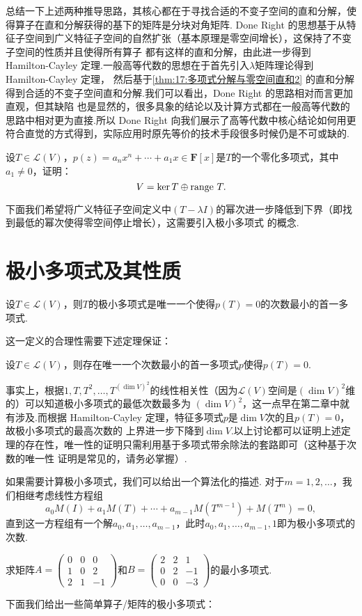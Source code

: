 总结一下上述两种推导思路，其核心都在于寻找合适的不变子空间的直和分解，使得算子在直和分解获得的基下的矩阵是分块对角矩阵.
 Done Right 的思想基于从特征子空间到广义特征子空间的自然扩张（基本原理是零空间增长），这保持了不变子空间的性质并且使得所有算子
都有这样的直和分解，由此进一步得到 Hamilton-Cayley 定理.一般高等代数的思想在于首先引入$\lambda$矩阵理论得到 Hamilton-Cayley 定理，
然后基于\autoref{thm:17:多项式分解与零空间直和2} 的直和分解得到合适的不变子空间直和分解.我们可以看出，Done Right 的思路相对而言更加直观，但其缺陷
也是显然的，很多具象的结论以及计算方式都在一般高等代数的思路中相对更为直接.所以 Done Right 向我们展示了高等代数中核心结论如何用更
符合直觉的方式得到，实际应用时原先等价的技术手段很多时候仍是不可或缺的.
\begin{example}
    设$T\in \mathcal{L}(V)$，$p(z)=a_nx^n+\cdots+a_1x\in\mathbf{F}[x]$是$T$的一个零化多项式，其中$a_1\neq 0$，证明：
    \[V=\ker T\oplus\textup{range }T.\]
\end{example}
下面我们希望将广义特征子空间定义中$(T-\lambda I)$的幂次进一步降低到下界（即找到最低的幂次使得零空间停止增长），这需要引入极小多项式
的概念.

\section{极小多项式及其性质}
\begin{definition}
    设$T\in \mathcal{L}(V)$，则$T$的极小多项式是唯一一个使得$p(T)=0$的次数最小的首一多项式.
\end{definition}
这一定义的合理性需要下述定理保证：
\begin{theorem}
    设$T\in \mathcal{L}(V)$，则存在唯一一个次数最小的首一多项式$p$使得$p(T)=0$.
\end{theorem}
事实上，根据$1,T,T^2,\ldots,T^{(\dim V)^2}$的线性相关性（因为$\mathcal{L}(V)$空间是$(\dim V)^2$维的）可以知道极小多项式的最低次数最多为
$(\dim V)^2$，这一点早在第二章中就有涉及.而根据 Hamilton-Cayley 定理，特征多项式$p$是$\dim V$次的且$p(T)=0$，故极小多项式的最高次数的
上界进一步下降到$\dim V$.以上讨论都可以证明上述定理的存在性，唯一性的证明只需利用基于多项式带余除法的套路即可（这种基于次数的唯一性
证明是常见的，请务必掌握）.

如果需要计算极小多项式，我们可以给出一个算法化的描述. 对于$m=1,2,\ldots$，我们相继考虑线性方程组
\[a_0M(I)+a_1M(T)+\cdots+a_{m-1}M(T^{m-1})+M(T^m)=0,\]
直到这一方程组有一个解$a_0,a_1,\ldots,a_{m-1}$，此时$a_0,a_1,\ldots,a_{m-1},1$即为极小多项式的次数.
\begin{example} \label{ex:17:最小多项式}
    求矩阵$A=\begin{pmatrix}
        0 & 0 & 0 \\ 1 & 0 & 2 \\ 2 & 1 & -1
    \end{pmatrix}$和$B=\begin{pmatrix}
        2 & 2 & 1 \\ 0 & 2 & -1 \\ 0 & 0 & -3
    \end{pmatrix}$的最小多项式.
\end{example}
下面我们给出一些简单算子/矩阵的极小多项式：

